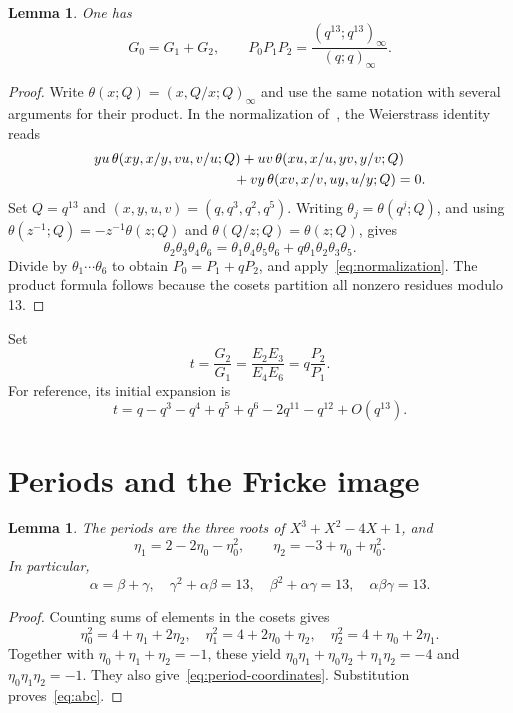 \documentclass[11pt]{amsart}
\newtheorem{lemma}[theorem]{Lemma}
\theoremstyle{remark}
\begin{document}
\begin{lemma}\label{lem:theta}
One has
\begin{equation}\label{eq:theta-relation}
 G_0=G_1+G_2,\qquad P_0P_1P_2=\frac{(q^{13};q^{13})_\infty}{(q;q)_\infty}.
\end{equation}
\end{lemma}
\begin{proof}
Write $\theta(x;Q)=(x,Q/x;Q)_\infty$ and use the same notation with several arguments for their product. In the normalization of~\cite{Koornwinder}, the Weierstrass identity reads
\begin{align*}
 &yu\,\theta(xy,x/y,vu,v/u;Q)
 +uv\,\theta(xu,x/u,yv,y/v;Q)\\
 &\hspace{35mm}+vy\,\theta(xv,x/v,uy,u/y;Q)=0.
\end{align*}
Set $Q=q^{13}$ and $(x,y,u,v)=(q,q^3,q^2,q^5)$. Writing $\theta_j=\theta(q^j;Q)$, and using
$\theta(z^{-1};Q)=-z^{-1}\theta(z;Q)$ and $\theta(Q/z;Q)=\theta(z;Q)$, gives
\[
 \theta_2\theta_3\theta_4\theta_6
 =\theta_1\theta_4\theta_5\theta_6
   +q\theta_1\theta_2\theta_3\theta_5.
\]
Divide by $\theta_1\cdots\theta_6$ to obtain $P_0=P_1+qP_2$, and apply~\eqref{eq:normalization}. The product formula follows because the cosets partition all nonzero residues modulo 13.
\end{proof}

Set
\begin{equation}\label{eq:t}
 t=\frac{G_2}{G_1}=\frac{E_2E_3}{E_4E_6}=q\frac{P_2}{P_1}.
\end{equation}
For reference, its initial expansion is
\begin{equation}\label{eq:t-expansion}
 t=q-q^3-q^4+q^5+q^6-2q^{11}-q^{12}+O(q^{13}).
\end{equation}

\section{Periods and the Fricke image}
\begin{lemma}\label{lem:periods}
The periods are the three roots of $X^3+X^2-4X+1$, and
\begin{equation}\label{eq:period-coordinates}
 \eta_1=2-2\eta_0-\eta_0^2,\qquad
 \eta_2=-3+\eta_0+\eta_0^2.
\end{equation}
In particular,
\begin{equation}\label{eq:abc}
 \alpha=\beta+\gamma,\quad \gamma^2+\alpha\beta=13,
 \quad \beta^2+\alpha\gamma=13,\quad \alpha\beta\gamma=13.
\end{equation}
\end{lemma}
\begin{proof}
Counting sums of elements in the cosets gives
\[
 \eta_0^2=4+\eta_1+2\eta_2,\quad
 \eta_1^2=4+2\eta_0+\eta_2,\quad
 \eta_2^2=4+\eta_0+2\eta_1.
\]
Together with $\eta_0+\eta_1+\eta_2=-1$, these yield
$\eta_0\eta_1+\eta_0\eta_2+\eta_1\eta_2=-4$ and
$\eta_0\eta_1\eta_2=-1$. They also give~\eqref{eq:period-coordinates}. Substitution proves~\eqref{eq:abc}.
\end{proof}
\end{document}
